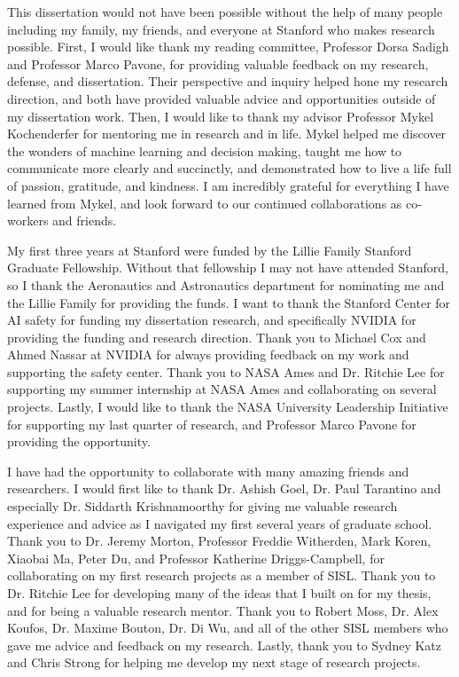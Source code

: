 This dissertation would not have been possible without the help of many people including my family, my friends, and everyone at Stanford who makes research possible. 
First, I would like thank my reading committee, Professor Dorsa Sadigh and Professor Marco Pavone, for providing valuable feedback on my research, defense, and dissertation. Their perspective and inquiry helped hone my research direction, and both have provided valuable advice and opportunities outside of my dissertation work. Then, I would like to thank my advisor Professor Mykel Kochenderfer for mentoring me in research and in life. Mykel helped me discover the wonders of machine learning and decision making, taught me how to communicate more clearly and succinctly, and demonstrated how to live a life full of passion, gratitude, and kindness. I am incredibly grateful for everything I have learned from Mykel, and look forward to our continued collaborations as co-workers and friends. 

My first three years at Stanford were funded by the Lillie Family Stanford Graduate Fellowship. Without that fellowship I may not have attended Stanford, so I thank the Aeronautics and Astronautics department for nominating me and the Lillie Family for providing the funds. I want to thank the Stanford Center for AI safety for funding my dissertation research, and specifically NVIDIA for providing the funding and research direction. Thank you to Michael Cox and Ahmed Nassar at NVIDIA for always providing feedback on my work and supporting the safety center. Thank you to NASA Ames and Dr. Ritchie Lee for supporting my summer internship at NASA Ames and collaborating on several projects. Lastly, I would like to thank the NASA University Leadership Initiative for supporting my last quarter of research, and Professor Marco Pavone for providing the opportunity.

I have had the opportunity to collaborate with many amazing friends and researchers. I would first like to thank Dr. Ashish Goel, Dr. Paul Tarantino and especially Dr. Siddarth Krishnamoorthy for giving me valuable research experience and advice as I navigated my first several years of graduate school. Thank you to Dr. Jeremy Morton, Professor Freddie Witherden, Mark Koren, Xiaobai Ma, Peter Du, and Professor Katherine Driggs-Campbell, for collaborating on my first research projects as a member of SISL. Thank you to Dr. Ritchie Lee for developing many of the ideas that I built on for my thesis, and for being a valuable research mentor. Thank you to Robert Moss, Dr. Alex Koufos, Dr. Maxime Bouton, Dr. Di Wu, and all of the other SISL members who gave me advice and feedback on my research. Lastly, thank you to Sydney Katz and Chris Strong for helping me develop my next stage of research projects. 

